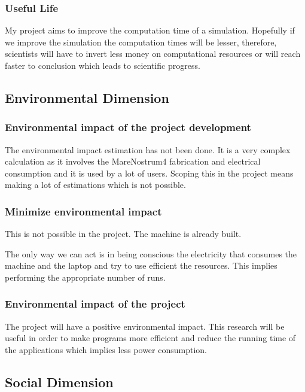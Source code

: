 \subsubsection{Useful Life}
\justify
My project aims to improve the computation time of a simulation. Hopefully if we improve the simulation the computation times will be lesser, therefore, scientists will have to invert less money on computational resources or will reach faster to conclusion which leads to scientific progress. 

\subsection{Environmental Dimension}

\subsubsection{Environmental impact of the project development}

\justify
The environmental impact estimation has not been done. It is a very complex calculation as it involves the MareNostrum4 fabrication and electrical consumption and it is used by a lot of users. Scoping this in the project means making a lot of estimations which is not possible.

\subsubsection{Minimize environmental impact}

\justify
This is not possible in the project. The machine is already built.

\justify
The only way we can act is in being conscious the electricity that consumes the machine and the laptop and try to use efficient the resources. This implies performing the appropriate number of runs.

\subsubsection{Environmental impact of the project}

\justify
The project will have a positive environmental impact. This research will be useful in order to make programs more efficient and reduce the running time of the applications which implies less power consumption.

\subsection{Social Dimension}

